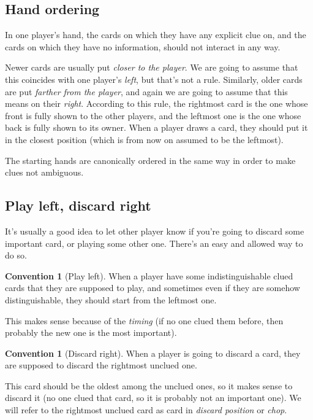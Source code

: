\documentclass[a4paper]{article}
\theoremstyle{plain}
\theoremstyle{definition}
\newtheorem{convention}[theorem]{Convention}
\begin{document}
\subsection{Hand ordering}

In one player's hand, the cards on which they have any explicit clue on, and the cards on which they have no information, should not interact in any way.

Newer cards are usually put \textit{closer to the player}. We are going to assume that this coincides with one player's \textit{left}, but that's not a rule. Similarly, older cards are put \textit{farther from the player}, and again we are going to assume that this means on their \textit{right}. According to this rule, the rightmost card is the one whose front is fully shown to the other players, and the leftmost one is the one whose back is fully shown to its owner. When a player draws a card, they should put it in the closest position (which is from now on assumed to be the leftmost).

The starting hands are canonically ordered in the same way in order to make clues not ambiguous.

\subsection{Play left, discard right}

It's usually a good idea to let other player know if you're going to discard some important card, or playing some other one. There's an easy and allowed way to do so.

\begin{convention}[Play left]
	\label{play-left}
	When a player have some indistinguishable clued cards that they are supposed to play, and sometimes even if they are somehow distinguishable, they should start from the leftmost one.
\end{convention}

This makes sense because of the \textit{timing} (if no one clued them before, then probably the new one is the most important).

\begin{convention}[Discard right]
	\label{discard-right}
	When a player is going to discard a card, they are supposed to discard the rightmost unclued one.
\end{convention}

This card should be the oldest among the unclued ones, so it makes sense to discard it (no one clued that card, so it is probably not an important one). We will refer to the rightmost unclued card as card in \textit{discard position} or \textit{chop}.
\end{document}
